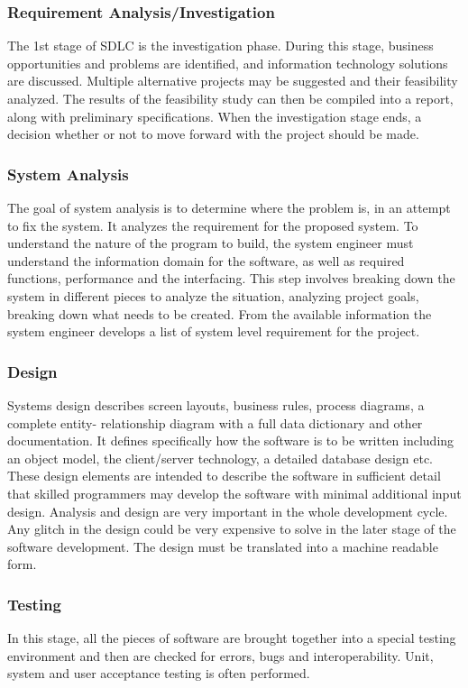 \documentclass[12pt, a4paper]{report}
\begin{document}
  \subsubsection{Requirement Analysis/Investigation}
  The 1st stage of SDLC is the investigation phase. During this stage, business opportunities and problems are identified, and information technology solutions are discussed. Multiple alternative projects may be suggested and their feasibility analyzed. The results of the feasibility study can then be compiled into a report, along with preliminary specifications. When the investigation stage ends, a decision whether or not to move forward with the project should be made.
  
  \subsubsection{System Analysis}
  The goal of system analysis is to determine where the problem is, in an attempt to fix the system. It analyzes the requirement for the proposed system. To understand the nature of the program to build, the system engineer must understand the information domain for the software, as well as required functions, performance and the interfacing. This step involves breaking down the system in different pieces to analyze the situation, analyzing project goals, breaking down what needs to be created. From the available information the system engineer develops a list of system level requirement for the project.
  
  \subsubsection{Design}
  Systems design describes screen layouts, business rules, process diagrams, a complete entity- relationship diagram with a full data dictionary and other documentation. It defines specifically how the software is to be written including an object model, the client/server technology, a detailed database design etc. These design elements are intended to describe the software in sufficient detail that skilled programmers may develop the software with minimal additional input design. Analysis and design are very important in the whole development cycle. Any glitch in the design could be very expensive to solve in the later stage of the software development. The design must be translated into a machine readable form.
  
  \subsubsection{Testing}
  In this stage, all the pieces of software are brought together into a special testing environment and then are checked for errors, bugs and interoperability. Unit, system and user acceptance testing is often performed.
  
\end{document}
